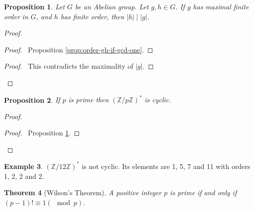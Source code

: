 \documentclass{book}
\let\qed\relax
\newtheorem{prop}{Proposition}[chapter]
\newtheorem{thm}[prop]{Theorem}
\theoremstyle{definition}
\newtheorem{ex}[prop]{Example}
\begin{document}
\begin{prop}
    \label{prop:maximal-finite-order}
    Let $G$ be an Abelian group. Let $g,h \in G$. If $g$ has maximal finite order in $G$, and $h$ has finite order, then $|h| \mid |g|$.
\end{prop}

\begin{proof}
    \pf
    \begin{proof}
        \pf\ Proposition \ref{prop:order-gh-if-gcd-one}.
    \end{proof}
    \qedstep
    \begin{proof}
        \pf\ This contradicts the maximality of $|g|$.
    \end{proof}
    \qed
\end{proof}

\begin{prop}
    If $p$ is prime then $(\mathbb{Z} / p \mathbb{Z})^*$ is cyclic.
\end{prop}

\begin{proof}
    \pf
    \begin{proof}
        \pf\ Proposition \ref{prop:maximal-finite-order}.
    \end{proof}
    \qed
\end{proof}

\begin{ex}
    $(\mathbb{Z} / 12 \mathbb{Z})^*$ is not cyclic. Its elements are 1, 5, 7 and 11 with orders 1, 2, 2 and 2.
\end{ex}

\begin{thm}[Wilson's Theorem]
    A positive integer $p$ is prime if and only if $(p-1)! \equiv 1 (\mod p)$.
\end{thm}
\end{document}
